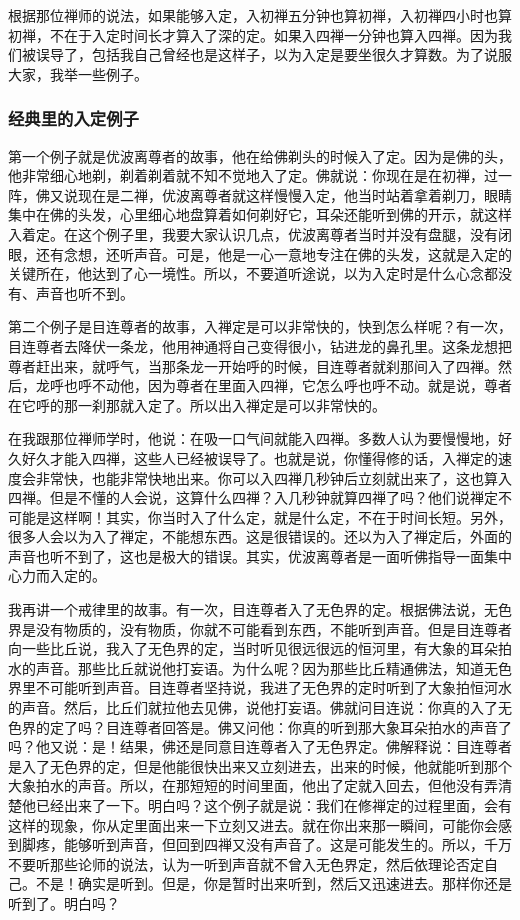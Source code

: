 \documentclass{book}
\begin{document}
根据那位禅师的说法，如果能够入定，入初禅五分钟也算初禅，入初禅四小时也算初禅，不在于入定时间长才算入了深的定。如果入四禅一分钟也算入四禅。因为我们被误导了，包括我自己曾经也是这样子，以为入定是要坐很久才算数。为了说服大家，我举一些例子。

\subsubsection{经典里的入定例子}

第一个例子就是优波离尊者的故事，他在给佛剃头的时候入了定。因为是佛的头，他非常细心地剃，剃着剃着就不知不觉地入了定。佛就说：你现在是在初禅，过一阵，佛又说现在是二禅，优波离尊者就这样慢慢入定，他当时站着拿着剃刀，眼睛集中在佛的头发，心里细心地盘算着如何剃好它，耳朵还能听到佛的开示，就这样入着定。在这个例子里，我要大家认识几点，优波离尊者当时并没有盘腿，没有闭眼，还有念想，还听声音。可是，他是一心一意地专注在佛的头发，这就是入定的关键所在，他达到了心一境性。所以，不要道听途说，以为入定时是什么心念都没有、声音也听不到。

第二个例子是目连尊者的故事，入禅定是可以非常快的，快到怎么样呢？有一次，目连尊者去降伏一条龙，他用神通将自己变得很小，钻进龙的鼻孔里。这条龙想把尊者赶出来，就呼气，当那条龙一开始呼的时候，目连尊者就刹那间入了四禅。然后，龙呼也呼不动他，因为尊者在里面入四禅，它怎么呼也呼不动。就是说，尊者在它呼的那一刹那就入定了。所以出入禅定是可以非常快的。

在我跟那位禅师学时，他说：在吸一口气间就能入四禅。多数人认为要慢慢地，好久好久才能入四禅，这些人已经被误导了。也就是说，你懂得修的话，入禅定的速度会非常快，也能非常快地出来。你可以入四禅几秒钟后立刻就出来了，这也算入四禅。但是不懂的人会说，这算什么四禅？入几秒钟就算四禅了吗？他们说禅定不可能是这样啊！其实，你当时入了什么定，就是什么定，不在于时间长短。另外，很多人会以为入了禅定，不能想东西。这是很错误的。还以为入了禅定后，外面的声音也听不到了，这也是极大的错误。其实，优波离尊者是一面听佛指导一面集中心力而入定的。

我再讲一个戒律里的故事。有一次，目连尊者入了无色界的定。根据佛法说，无色界是没有物质的，没有物质，你就不可能看到东西，不能听到声音。但是目连尊者向一些比丘说，我入了无色界的定，当时听见很远很远的恒河里，有大象的耳朵拍水的声音。那些比丘就说他打妄语。为什么呢？因为那些比丘精通佛法，知道无色界里不可能听到声音。目连尊者坚持说，我进了无色界的定时听到了大象拍恒河水的声音。然后，比丘们就拉他去见佛，说他打妄语。佛就问目连说：你真的入了无色界的定了吗？目连尊者回答是。佛又问他：你真的听到那大象耳朵拍水的声音了吗？他又说：是！结果，佛还是同意目连尊者入了无色界定。佛解释说：目连尊者是入了无色界的定，但是他能很快出来又立刻进去，出来的时候，他就能听到那个大象拍水的声音。所以，在那短短的时间里面，他出了定就入回去，但他没有弄清楚他已经出来了一下。明白吗？这个例子就是说：我们在修禅定的过程里面，会有这样的现象，你从定里面出来一下立刻又进去。就在你出来那一瞬间，可能你会感到脚疼，能够听到声音，但回到四禅又没有声音了。这是可能发生的。所以，千万不要听那些论师的说法，认为一听到声音就不曾入无色界定，然后依理论否定自己。不是！确实是听到。但是，你是暂时出来听到，然后又迅速进去。那样你还是听到了。明白吗？
\end{document}
